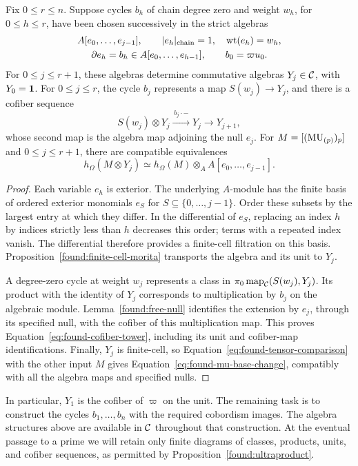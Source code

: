 \begin{proposition}\label{found:koszul-realization}
Fix $0\leq r\leq n$. Suppose cycles $b_h$ of chain degree zero and
weight $w_h$, for $0\leq h\leq r$, have been chosen successively
in the strict algebras
\begin{equation}\label{eq:found-exterior-tower}
 \begin{gathered}
 A[e_0,\ldots,e_{j-1}],\qquad
 |e_h|_{\mathrm{chain}}=1,\quad \operatorname{wt}(e_h)=w_h,\\
 \partial e_h=b_h\in A[e_0,\ldots,e_{h-1}],
 \qquad b_0=\varpi u_0.
 \end{gathered}
\end{equation}
For $0\leq j\leq r+1$, these algebras determine commutative
algebras $Y_j\in\mathcal C$, with $Y_0=\mathbf 1$. For $0\leq j\leq r$,
the cycle $b_j$ represents a map
$S(w_j)\to Y_j$, and there is a cofiber sequence
\begin{equation}\label{eq:found-cofiber-tower}
 S(w_j)\otimes Y_j\xrightarrow{\,b_j\cdot-\,}Y_j
                    \longrightarrow Y_{j+1},
\end{equation}
whose second map is the algebra map adjoining the null $e_j$.
For $M=[(\mathrm{MU}_{(p)})_p]$ and $0\leq j\leq r+1$, there are
compatible equivalences
\begin{equation}\label{eq:found-mu-base-change}
 h_\Omega(M\otimes Y_j)
   \simeq h_\Omega(M)\otimes_A A[e_0,\ldots,e_{j-1}].
\end{equation}
\end{proposition}

\begin{proof}
Each variable $e_h$ is exterior.  The underlying $A$-module has the
finite basis of ordered exterior monomials $e_S$ for
$S\subseteq\{0,\ldots,j-1\}$.  Order these subsets by the largest
entry at which they differ.  In the differential of $e_S$, replacing
an index $h$ by indices strictly less than $h$ decreases this order;
terms with a repeated index vanish.  The differential therefore
provides a finite-cell filtration on this basis.  Proposition~\ref{found:finite-cell-morita}
transports the algebra and its unit to $Y_j$.

A degree-zero cycle at weight $w_j$ represents a class in
$\pi_0\operatorname{map}_{\mathcal C}(S(w_j),Y_j)$.  Its product with the identity of
$Y_j$ corresponds to multiplication by $b_j$ on the algebraic module.
Lemma~\ref{found:free-null} identifies the extension by $e_j$, through
its specified null, with the cofiber of this multiplication map.
This proves Equation~\eqref{eq:found-cofiber-tower}, including its
unit and cofiber-map identifications.  Finally, $Y_j$ is finite-cell,
so Equation~\eqref{eq:found-tensor-comparison} with the other input
$M$ gives Equation~\eqref{eq:found-mu-base-change}, compatibly with
all the algebra maps and specified nulls.
\end{proof}

In particular, $Y_1$ is the cofiber of $\varpi$ on the unit.  The
remaining task is to construct the cycles $b_1,\ldots,b_n$ with the
required cobordism images.  The algebra structures above are available
in $\mathcal C$ throughout that construction.  At the eventual passage to a
prime we will retain only finite diagrams of classes, products,
units, and cofiber sequences, as permitted by
Proposition~\ref{found:ultraproduct}.
